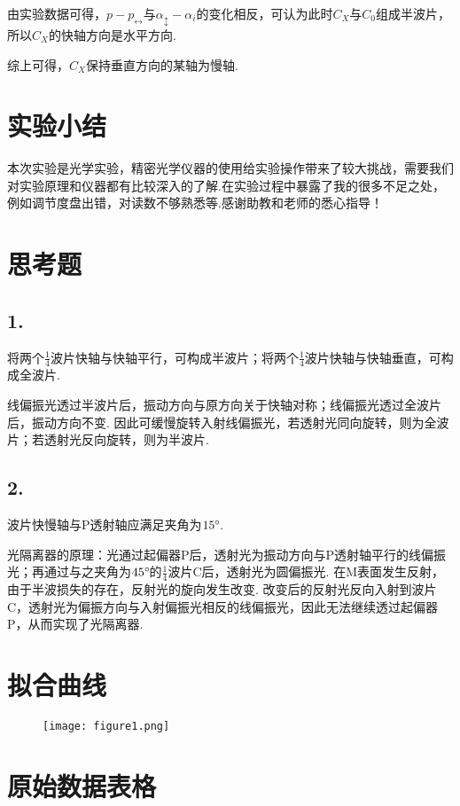 \documentclass{thureport}
\def\de{{\ensuremath{^\circ\hspace{-0.09em}}}}
\begin{document}
由实验数据可得，$p-p_{\leftrightarrow}$与$\alpha_{\updownarrow}-\alpha_i$的变化相反，可认为此时$C_X$与$C_0$组成半波片，所以$C_X$的快轴方向是水平方向.

综上可得，$C_X$保持垂直方向的某轴为慢轴.


\section{实验小结}
本次实验是光学实验，精密光学仪器的使用给实验操作带来了较大挑战，需要我们对实验原理和仪器都有比较深入的了解.在实验过程中暴露了我的很多不足之处，例如调节度盘出错，对读数不够熟悉等.感谢助教和老师的悉心指导！

\section{思考题}
\subsection*{1.}
将两个$\frac{1}{4}$波片快轴与快轴平行，可构成半波片；将两个$\frac{1}{4}$波片快轴与快轴垂直，可构成全波片.

线偏振光透过半波片后，振动方向与原方向关于快轴对称；线偏振光透过全波片后，振动方向不变. 因此可缓慢旋转入射线偏振光，若透射光同向旋转，则为全波片；若透射光反向旋转，则为半波片.

\subsection*{2.}
波片快慢轴与P透射轴应满足夹角为$15\de$.

光隔离器的原理：光通过起偏器P后，透射光为振动方向与P透射轴平行的线偏振光；再通过与之夹角为$45\de$的$\frac{1}{4}$波片C后，透射光为圆偏振光. 在M表面发生反射，由于半波损失的存在，反射光的旋向发生改变. 改变后的反射光反向入射到波片C，透射光为偏振方向与入射偏振光相反的线偏振光，因此无法继续透过起偏器P，从而实现了光隔离器.

\clearpage
\section{拟合曲线}
\begin{figure}[h]
	\centering
	\texttt{[image: figure1.png]}
\end{figure} 
\newpage
\section{原始数据表格}
\end{document}
